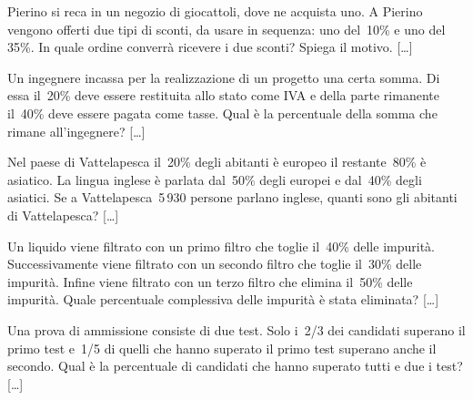 \begin{multicols}{2}
\begin{esercizio}
\label{ese:3.206}
Pierino si reca in un negozio di giocattoli, dove ne acquista uno. A
Pierino vengono offerti due tipi di sconti, da usare in sequenza: uno 
del~10\% e uno del
35\%. In quale ordine converrà ricevere i due sconti? Spiega il
motivo. \hfill [\dots]
\end{esercizio}


\begin{esercizio}
\label{ese:3.208}
Un ingegnere incassa per la realizzazione di un progetto una
certa somma. Di essa il~20\% deve essere restituita allo stato come IVA
e della parte rimanente il~40\% deve essere pagata come tasse. Qual è
la percentuale della somma che rimane all'ingegnere? \hfill [\dots]
\end{esercizio}

\begin{esercizio}
\label{ese:3.209}
Nel paese di Vattelapesca il~20\% degli abitanti è europeo il
restante~80\% è asiatico. La lingua inglese è parlata dal~50\% degli
europei e dal~40\% degli asiatici. Se a Vattelapesca~5\,930 persone
parlano inglese, quanti sono gli abitanti di Vattelapesca? \hfill [\dots]
\end{esercizio}

\begin{esercizio}
\label{ese:3.210}
Un liquido viene filtrato con un primo filtro che toglie il~40\%
delle impurità. Successivamente viene filtrato con un secondo filtro
che toglie il~30\% delle impurità. Infine viene filtrato con un terzo
filtro che elimina il~50\% delle impurità. Quale percentuale
complessiva delle impurità è stata eliminata? \hfill [\dots]
\end{esercizio}

\begin{esercizio}
\label{ese:3.211}
Una prova di ammissione consiste di due test. Solo i~2/3 dei
candidati superano il primo test e~1/5 di quelli che hanno superato il
primo test superano anche il secondo. Qual è la percentuale di
candidati che hanno superato tutti e due i test? \hfill [\dots]
\end{esercizio}


\end{multicols}
